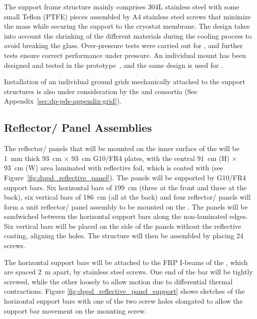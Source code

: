 The support frame structure mainly comprises \num{304}L stainless steel with some small Teflon (PTFE) pieces assembled by A4 stainless steel screws that minimize the mass while securing the  support to the cryostat membrane. The design %
takes into account the shrinking of the different materials during the cooling process to avoid breaking the  glass.
Over-pressure tests were carried out for , and further tests ensure correct performance under pressure. An individual  mount has been designed and tested in the   prototype~\cite{Zambelli:2017dkg}, and the same design is used for .

Installation of an individual ground grids mechanically attached to the  support structures is also under consideration by the  and \dual {} consortia (See Appendix~\ref{sec:dp-pds-appendix-grid}).


\subsection{Reflector/ Panel Assemblies}
\label{subsec:dp-pds-mechanics-reflectors}

The reflector/ panels that will be mounted on the inner surface of the  will be \SI{1}{\mm} thick \SI{93}{\cm} $\times$ \SI{93}{\cm} G10/FR4 plates, with the central \SI{91}{\cm} (H) $\times$ \SI{93}{\cm} (W) area laminated with reflective foil, which is coated with  (see Figure~\ref{fig:dppd_reflective_panel}). The panels will be supported by G10/FR4 support bars. Six horizontal bars of \SI{199}{\cm} (three at the front and three at the back), six vertical bars of \SI{186}{\cm} (all at the back) and four reflector/ panels will form a unit reflector/ panel assembly to be mounted on the . The panels will be sandwiched between the horizontal support bars along the non-laminated edges. Six vertical bars will be placed on the side of the panels without the reflective coating, aligning the holes. The structure will then be assembled by placing \num{24} screws.

The horizontal support bars will be attached to the FRP I-beams of the , which are spaced \SI{2}{\m} apart, by stainless steel screws. One end of the bar will be tightly screwed, while the other loosely to allow motion due to differential thermal contractions. Figure \ref{fig:dppd_reflective_panel_support} shows sketches of the horizontal support bars with one of the two screw holes elongated to allow the support bar movement on the mounting screw.

